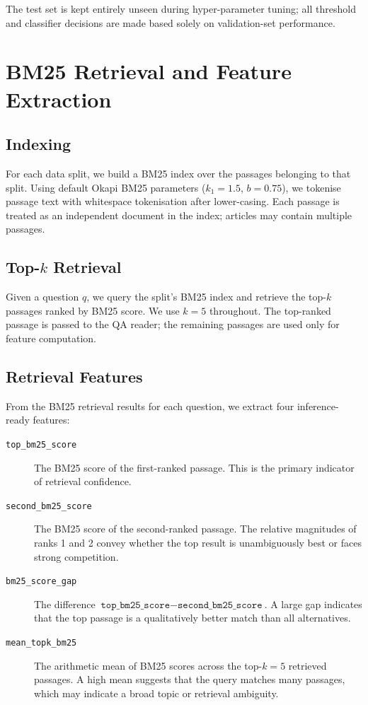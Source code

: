 The test set is kept entirely unseen during hyper-parameter tuning; all
threshold and classifier decisions are made based solely on validation-set
performance.

\section{BM25 Retrieval and Feature Extraction}
\label{sec:meth_bm25}

\subsection{Indexing}

For each data split, we build a BM25 index over the passages belonging to that
split. Using default Okapi BM25 parameters ($k_1 = 1.5$, $b = 0.75$), we
tokenise passage text with whitespace tokenisation after lower-casing. Each
passage is treated as an independent document in the index; articles may contain
multiple passages.

\subsection{Top-$k$ Retrieval}

Given a question $q$, we query the split's BM25 index and retrieve the top-$k$
passages ranked by BM25 score. We use $k = 5$ throughout. The top-ranked
passage is passed to the QA reader; the remaining passages are used only for
feature computation.

\subsection{Retrieval Features}

From the BM25 retrieval results for each question, we extract four inference-ready
features:

\begin{description}
  \item[\texttt{top\_bm25\_score}] The BM25 score of the first-ranked passage.
        This is the primary indicator of retrieval confidence.

  \item[\texttt{second\_bm25\_score}] The BM25 score of the second-ranked
        passage. The relative magnitudes of ranks 1 and 2 convey whether the
        top result is unambiguously best or faces strong competition.

  \item[\texttt{bm25\_score\_gap}] The difference
        $\texttt{top\_bm25\_score} - \texttt{second\_bm25\_score}$. A large
        gap indicates that the top passage is a qualitatively better match than
        all alternatives.

  \item[\texttt{mean\_topk\_bm25}] The arithmetic mean of BM25 scores across
        the top-$k = 5$ retrieved passages. A high mean suggests that the query
        matches many passages, which may indicate a broad topic or retrieval
        ambiguity.
\end{description}


